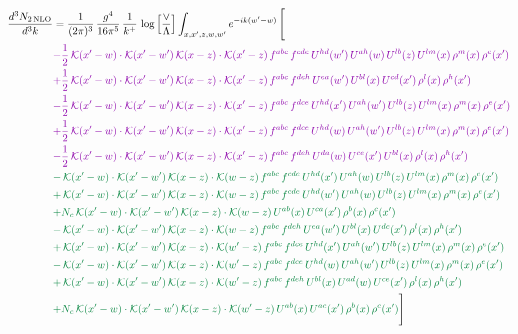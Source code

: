 \documentclass[10pt]{article}
\numberwithin{equation}{section}
\begin{document}
\begin{align}
\frac{d^{3}N_{2\,\mathrm{NLO}}}{d^{3}k} & = \frac{1}{(2\pi)^{3}}\,\frac{g^{4}}{16\pi^{5}}\,\frac{1}{k^{+}}\,\log\Big[\frac{\vee}{\Lambda}\Big]\int_{x,x',z,w,w'}e^{-ik(w'-w)}\,\Bigg[\notag\\ &{\color{CC} -\frac{1}{2}\,\mathcal{K}(x'-w)\cdot\mathcal{K}(x'-w')\,\mathcal{K}(x-z)\cdot\mathcal{K}(x'-z)\,f^{abc}\,f^{cde}\,U^{hd}(w')\,U^{ah}(w)\,U^{lb}(z)\,U^{lm}(x)\,\rho^{m}(x)\,\rho^{e}(x')} \notag\\
&{\color{CC} +\frac{1}{2}\,\mathcal{K}(x'-w)\cdot\mathcal{K}(x'-w')\,\mathcal{K}(x-z)\cdot\mathcal{K}(x'-z)\,f^{abc}\,f^{deh}\,U^{ea}(w')\,U^{bl}(x)\,U^{cd}(x')\,\rho^{l}(x)\,\rho^{h}(x')} \notag\\
&{\color{CC} -\frac{1}{2}\,\mathcal{K}(x'-w)\cdot\mathcal{K}(x'-w')\,\mathcal{K}(x-z)\cdot\mathcal{K}(x'-z)\,f^{abc}\,f^{dce}\,U^{hd}(x')\,U^{ah}(w')\,U^{lb}(z)\,U^{lm}(x)\,\rho^{m}(x)\,\rho^{e}(x')} \notag\\
&{\color{CC} +\frac{1}{2}\,\mathcal{K}(x'-w)\cdot\mathcal{K}(x'-w')\,\mathcal{K}(x-z)\cdot\mathcal{K}(x'-z)\,f^{abc}\,f^{dce}\,U^{hd}(w)\,U^{ah}(w')\,U^{lb}(z)\,U^{lm}(x)\,\rho^{m}(x)\,\rho^{e}(x')} \notag\\
&{\color{CC} -\frac{1}{2}\,\mathcal{K}(x'-w)\cdot\mathcal{K}(x'-w')\,\mathcal{K}(x-z)\cdot\mathcal{K}(x'-z)\,f^{abc}\,f^{deh}\,U^{da}(w)\,U^{ce}(x')\,U^{bl}(x)\,\rho^{l}(x)\,\rho^{h}(x')} \notag\\
&{\color{JIM} -\,\mathcal{K}(x'-w)\cdot\mathcal{K}(x'-w')\,\mathcal{K}(x-z)\cdot\mathcal{K}(w-z)\,f^{abc}\,f^{cde}\,U^{hd}(x')\,U^{ah}(w)\,U^{lb}(z)\,U^{lm}(x)\,\rho^{m}(x)\,\rho^{e}(x')} \notag \\ &{\color{JIM}  +\,\mathcal{K}(x'-w)\cdot\mathcal{K}(x'-w')\,\mathcal{K}(x-z)\cdot\mathcal{K}(w-z)\,f^{abc}\,f^{cde}\,U^{hd}(w')\,U^{ah}(w)\,U^{lb}(z)\,U^{lm}(x)\,\rho^{m}(x)\,\rho^{e}(x')} \notag\\
&{\color{JIM} +N_{c}\,\mathcal{K}(x'-w)\cdot\mathcal{K}(x'-w')\,\mathcal{K}(x-z)\cdot\mathcal{K}(w-z)\,U^{ab}(x)\,U^{ca}(x')\,\rho^{b}(x)\,\rho^{c}(x')} \notag\\
&{\color{JIM} -\,\mathcal{K}(x'-w)\cdot\mathcal{K}(x'-w')\,\mathcal{K}(x-z)\cdot\mathcal{K}(w-z)\,f^{abc}\,f^{deh}\,U^{ea}(w')\,U^{bl}(x)\,U^{dc}(x')\,\rho^{l}(x)\,\rho^{h}(x')} \notag\\
&{\color{JIM} +\,\mathcal{K}(x'-w)\cdot\mathcal{K}(x'-w')\,\mathcal{K}(x-z)\cdot\mathcal{K}(w'-z)\,f^{abc}\,f^{dce}\,U^{hd}(x')\,U^{ah}(w')\,U^{lb}(z)\,U^{lm}(x)\,\rho^{m}(x)\,\rho^{e}(x')} \notag\\
&{\color{JIM} -\,\mathcal{K}(x'-w)\cdot\mathcal{K}(x'-w')\,\mathcal{K}(x-z)\cdot\mathcal{K}(w'-z)\,f^{abc}\,f^{dce}\,U^{hd}(w)\,U^{ah}(w')\,U^{lb}(z)\,U^{lm}(x)\,\rho^{m}(x)\,\rho^{e}(x')} \notag\\
&{\color{JIM} +\,\mathcal{K}(x'-w)\cdot\mathcal{K}(x'-w')\,\mathcal{K}(x-z)\cdot\mathcal{K}(w'-z)\,f^{abc}\,f^{deh}\,U^{bl}(x)\,U^{ad}(w)\,U^{ce}(x')\,\rho^{l}(x)\,\rho^{h}(x')} \notag\\
&{\color{JIM} +N_{c}\,\mathcal{K}(x'-w)\cdot\mathcal{K}(x'-w')\,\mathcal{K}(x-z)\cdot\mathcal{K}(w'-z)\,U^{ab}(x)\,U^{ac}(x')\,\rho^{b}(x)\,\rho^{c}(x')}\Bigg] \end{align}
\end{document}
